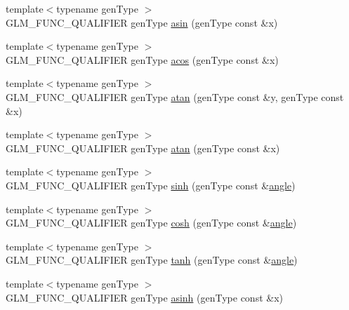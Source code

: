 \begin{DoxyCompactItemize}
\item 
{\footnotesize template$<$typename gen\-Type $>$ }\\G\-L\-M\-\_\-\-F\-U\-N\-C\-\_\-\-Q\-U\-A\-L\-I\-F\-I\-E\-R gen\-Type \hyperlink{group__core__func__trigonometric_gafca5e8c71ea06be0840227b4aafc5680}{asin} (gen\-Type const \&x)
\item 
{\footnotesize template$<$typename gen\-Type $>$ }\\G\-L\-M\-\_\-\-F\-U\-N\-C\-\_\-\-Q\-U\-A\-L\-I\-F\-I\-E\-R gen\-Type \hyperlink{group__core__func__trigonometric_gac85497ed2e39d4cac4ac32bed4dfc506}{acos} (gen\-Type const \&x)
\item 
{\footnotesize template$<$typename gen\-Type $>$ }\\G\-L\-M\-\_\-\-F\-U\-N\-C\-\_\-\-Q\-U\-A\-L\-I\-F\-I\-E\-R gen\-Type \hyperlink{group__core__func__trigonometric_gabf80ac0817d1db032dd6a0969aa2b84a}{atan} (gen\-Type const \&y, gen\-Type const \&x)
\item 
{\footnotesize template$<$typename gen\-Type $>$ }\\G\-L\-M\-\_\-\-F\-U\-N\-C\-\_\-\-Q\-U\-A\-L\-I\-F\-I\-E\-R gen\-Type \hyperlink{group__core__func__trigonometric_gaa7be96f0c12a40eeac5c7f04a3d465a1}{atan} (gen\-Type const \&x)
\item 
{\footnotesize template$<$typename gen\-Type $>$ }\\G\-L\-M\-\_\-\-F\-U\-N\-C\-\_\-\-Q\-U\-A\-L\-I\-F\-I\-E\-R gen\-Type \hyperlink{group__core__func__trigonometric_ga2e8c9a896e803661058de83429aa6eda}{sinh} (gen\-Type const \&\hyperlink{group__gtc__quaternion_ga23a3fc7ada5bbb665ff84c92c6e0542c}{angle})
\item 
{\footnotesize template$<$typename gen\-Type $>$ }\\G\-L\-M\-\_\-\-F\-U\-N\-C\-\_\-\-Q\-U\-A\-L\-I\-F\-I\-E\-R gen\-Type \hyperlink{group__core__func__trigonometric_gaa7685634f6e920ba9a683e5ec7aed976}{cosh} (gen\-Type const \&\hyperlink{group__gtc__quaternion_ga23a3fc7ada5bbb665ff84c92c6e0542c}{angle})
\item 
{\footnotesize template$<$typename gen\-Type $>$ }\\G\-L\-M\-\_\-\-F\-U\-N\-C\-\_\-\-Q\-U\-A\-L\-I\-F\-I\-E\-R gen\-Type \hyperlink{group__core__func__trigonometric_ga941f20e5315113d1a2e037f073a62f04}{tanh} (gen\-Type const \&\hyperlink{group__gtc__quaternion_ga23a3fc7ada5bbb665ff84c92c6e0542c}{angle})
\item 
{\footnotesize template$<$typename gen\-Type $>$ }\\G\-L\-M\-\_\-\-F\-U\-N\-C\-\_\-\-Q\-U\-A\-L\-I\-F\-I\-E\-R gen\-Type \hyperlink{group__core__func__trigonometric_gaa52acc1218a5ddd0f8d94fcd098685b1}{asinh} (gen\-Type const \&x)

\end{DoxyCompactItemize}
